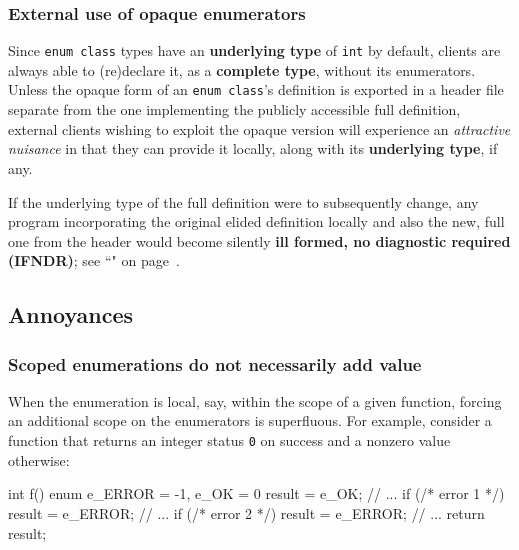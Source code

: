 \subsubsection[External use of opaque enumerators]{External use of opaque enumerators}\label{external-use-of-opaque-enumerators-enumclass}

Since \texttt{enum}~\texttt{class} types have an \textbf{underlying
type} of \texttt{int} by default, clients are always able to (re)declare
it, as a \textbf{complete type}, without its enumerators. Unless the
opaque form of an \texttt{enum}~\texttt{class}'s definition is exported
in a header file separate from the one implementing the publicly
accessible full definition, external clients wishing to exploit the
opaque version will experience an \emph{attractive nuisance} in that
they can provide it locally, along with its \textbf{underlying type}, if
any.

If the underlying type of the full definition were to subsequently
change, any program incorporating the original elided definition locally
and also the new, full one from the header would become silently \textbf{ill formed, no diagnostic required (IFNDR)}; see ``" on page~\pageref{enumopaque}.

\subsection[Annoyances]{Annoyances}\label{annoyances-enumclass}

\subsubsection[Scoped enumerations do not necessarily add value]{Scoped enumerations do not necessarily add value}\label{scoped-enumerations-do-not-necessarily-add-value}

When the enumeration is local, say, within the scope of a given
function, forcing an additional scope on the enumerators is superfluous.
For example, consider a function that returns an integer status
\texttt{0} on success and a nonzero value otherwise:

\begin{emcppslisting}[emcppserrorlines={5,7}]
int f()
{
    enum { e_ERROR = -1, e_OK = 0 } result = e_OK;
    // ...
    if (/* error 1 */) { result = e_ERROR; }
    // ...
    if (/* error 2 */) { result = e_ERROR; }
    // ...
    return result;
}
\end{emcppslisting}

